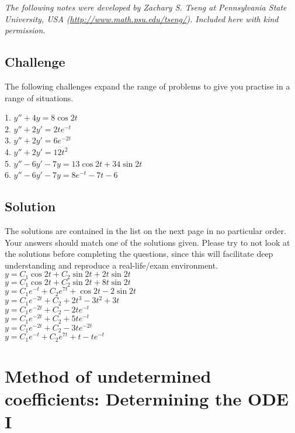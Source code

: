 \emph{The following notes were developed by Zachary S. Tseng at Pennsylvania State University, USA (\url{http://www.math.psu.edu/tseng/}). Included here with kind permission.}



\subsection*{Challenge}
The following challenges expand the range of problems to give you practise in a range of situations.

1. $y'' + 4y = 8 \cos 2t$\\
2. $y'' + 2y' = 2 te^{-t}$\\
3. $y'' + 2y' = 6 e^{-2t}$\\
4. $y'' + 2y' = 12 t^2$\\
5. $y'' - 6y' - 7y = 13 \cos 2t + 34 \sin 2t$\\
6. $y'' - 6y' - 7y = 8e^{-t} - 7t - 6$

\subsection*{Solution}
The solutions are contained in the list on the next page in no particular order. Your answers should match one of the solutions given. Please try to not look at the solutions before completing the questions, since this will facilitate deep understanding and reproduce a real-life/exam environment.
\newpage
$y = C_1 \cos 2t + C_2 \sin 2t + 2t \sin2t$\\ %
$y = C_1 \cos 2t + C_2 \sin 2t + 8t \sin2t$\\
$y = C_1 e^{-t} + C_2 e^{7t} + \cos 2t - 2 \sin 2t$\\ %
$y = C_1 e^{-2t} + C_2 + 2t^3 - 3t^2 + 3t$\\ %
$y = C_1 e^{-2t} + C_2 - 2te^{-t}$\\ %
$y = C_1 e^{-2t} + C_2 + 5te^{-t}$\\
$y = C_1 e^{-2t} + C_2 - 3te^{-2t}$\\ %
$y = C_1 e^{-t} +C_2 e^{7t} + t -te^{-t}$\\ %




\newpage
\section{Method of undetermined coefficients: Determining the ODE I}

